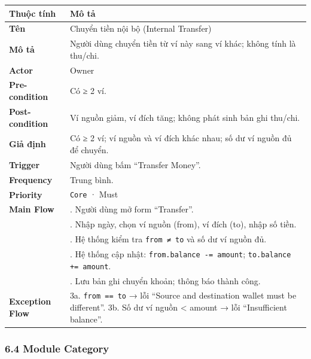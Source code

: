 \documentclass[11pt,a4paper]{article}
\newcounter{none}
\newcommand{\faintline}{%
  \noalign{\global\arrayrulecolor{faintgray}}%
  \hline
  \noalign{\global\arrayrulecolor{black}}%
} %
\begin{document}
{\def\LTcaptype{none}
\begin{longtable}[]{@{}
  >{\raggedright\arraybackslash}p{}
  >{\raggedright\arraybackslash}p{}@{}}
\toprule\noalign{}
\begin{minipage}[b]{\linewidth}\raggedright
Thuộc tính
\end{minipage} & \begin{minipage}[b]{\linewidth}\raggedright
Mô tả
\end{minipage} \\
\midrule\noalign{}
\endhead
\bottomrule\noalign{}
\endlastfoot
\textbf{Tên} & Chuyển tiền nội bộ (Internal Transfer) \\ \faintline
\textbf{Mô tả} & Người dùng chuyển tiền từ ví này sang ví khác; không tính là thu/chi. \\ \faintline
\textbf{Actor} & Owner \\ \faintline
\textbf{Pre-condition} & Có ≥ 2 ví. \\ \faintline
\textbf{Post-condition} & Ví nguồn giảm, ví đích tăng; không phát sinh bản ghi thu/chi. \\ \faintline
\textbf{Giả định} & Có ≥ 2 ví; ví nguồn và ví đích khác nhau; số dư ví nguồn đủ để chuyển. \\ \faintline
\textbf{Trigger} & Người dùng bấm ``Transfer Money''. \\ \faintline
\textbf{Frequency} & Trung bình. \\ \faintline
\textbf{Priority} & \texttt{Core} · Must \\ \faintline
\textbf{Main Flow} & 1. Người dùng mở form ``Transfer''.\\ 
&2. Nhập ngày, chọn ví nguồn (from), ví đích (to), nhập số tiền.\\ 
&3. Hệ thống kiểm tra \texttt{from ≠ to} và số dư ví nguồn đủ.\\
&4. Hệ thống cập nhật: \texttt{from.balance -= amount}; \texttt{to.balance += amount}.\\
&5. Lưu bản ghi chuyển khoản; thông báo thành công. \\ \faintline
\textbf{Exception Flow} & 3a. \texttt{from == to} → lỗi ``Source and destination wallet must be different''. 3b. Số dư ví nguồn < amount → lỗi ``Insufficient balance''. \\
\end{longtable}
}

\subsubsection{6.4 Module Category}\label{module-category}
\end{document}
